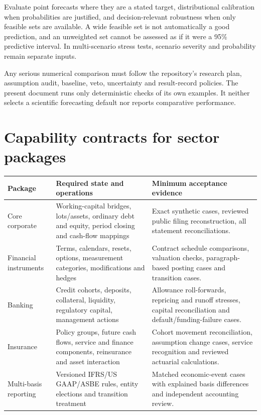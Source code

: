 Evaluate point forecasts where they are a stated target, distributional
calibration when probabilities are justified, and decision-relevant robustness
when only feasible sets are available. A wide feasible set is not automatically
a good prediction, and an unweighted set cannot be assessed as if it were a
95\% predictive interval. In multi-scenario stress tests, scenario severity and
probability remain separate inputs.

Any serious numerical comparison must follow the repository's research plan,
assumption audit, baseline, veto, uncertainty and result-record policies. The
present document runs only deterministic checks of its own examples. It
neither selects a scientific forecasting default nor reports comparative
performance.



\section{Capability contracts for sector packages}

\begin{longtable}{L{26mm}L{55mm}L{55mm}}
\toprule Package & Required state and operations & Minimum acceptance evidence\\\midrule\endhead
Core corporate & Working-capital bridges, lots/assets, ordinary debt and equity,
period closing and cash-flow mappings & Exact synthetic cases, reviewed public
filing reconstruction, all statement reconciliations.\\
Financial instruments & Terms, calendars, resets, options, measurement
categories, modifications and hedges & Contract schedule comparisons, valuation
checks, paragraph-based posting cases and transition cases.\\
Banking & Credit cohorts, deposits, collateral, liquidity, regulatory capital,
management actions & Allowance roll-forwards, repricing and runoff stresses,
capital reconciliation and default/funding-failure cases.\\
Insurance & Policy groups, future cash flows, service and finance components,
reinsurance and asset interaction & Cohort movement reconciliation, assumption
change cases, service recognition and reviewed actuarial calculations.\\
Multi-basis reporting & Versioned IFRS/US GAAP/ASBE rules, entity elections and
transition treatment & Matched economic-event cases with explained basis
differences and independent accounting review.\\\bottomrule
\end{longtable}

